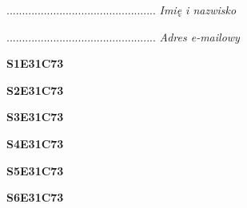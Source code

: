 \begin{turn}{90}\begin{minipage}{\linewidth} \vspace{20mm} ................................................  \textit{Imię i nazwisko}\end{minipage}\end{turn}

\begin{turn}{90}\begin{minipage}{\linewidth} \vspace{20mm} ................................................  \textit{Adres e-mailowy}\end{minipage}\end{turn}

\begin{turn}{90}\huge \begin{minipage}{\linewidth} \vspace{10mm}\textbf{S1E31C73}\end{minipage}\end{turn}

\begin{turn}{90}\huge \begin{minipage}{\linewidth} \vspace{10mm}\textbf{S2E31C73}\end{minipage}\end{turn}

\begin{turn}{90}\huge \begin{minipage}{\linewidth} \vspace{10mm}\textbf{S3E31C73}\end{minipage}\end{turn}

\begin{turn}{90}\huge \begin{minipage}{\linewidth} \vspace{10mm}\textbf{S4E31C73}\end{minipage}\end{turn}

\begin{turn}{90}\huge \begin{minipage}{\linewidth} \vspace{10mm}\textbf{S5E31C73}\end{minipage}\end{turn}

\begin{turn}{90}\huge \begin{minipage}{\linewidth} \vspace{10mm}\textbf{S6E31C73}\end{minipage}\end{turn}

